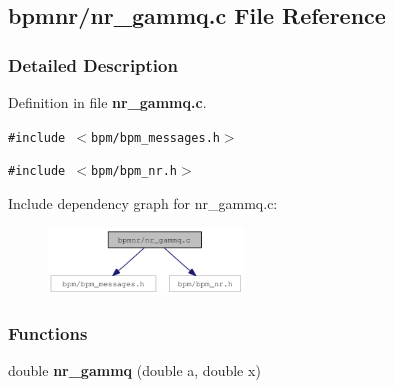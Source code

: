 \subsection{bpmnr/nr\_\-gammq.c File Reference}
\label{nr__gammq_8c}


\subsubsection{Detailed Description}


Definition in file {\bf nr\_\-gammq.c}.

{\tt \#include $<$bpm/bpm\_\-messages.h$>$}\par
{\tt \#include $<$bpm/bpm\_\-nr.h$>$}\par


Include dependency graph for nr\_\-gammq.c:\nopagebreak
\begin{figure}[H]
\begin{center}
\leavevmode
\includegraphics[width=147pt]{nr__gammq_8c__incl}
\end{center}
\end{figure}
\subsubsection*{Functions}
\begin{CompactItemize}
\item 
double {\bf nr\_\-gammq} (double a, double x)
\end{CompactItemize}
